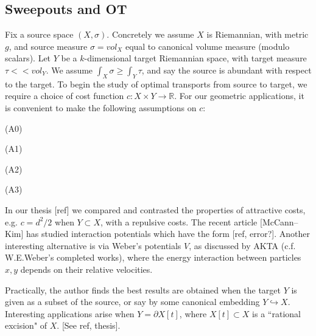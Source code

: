 \documentclass[12pt]{amsart}
\theoremstyle{definition}
\theoremstyle{remark}
\newcommand{\bR}{\mathbb{R}}
\newcommand{\del}{\partial}
\begin{document}
\subsection{Sweepouts and OT}

Fix a source space $(X, \sigma)$. Concretely we assume $X$ is Riemannian, with metric $g$, and source measure $\sigma=vol_X$ equal to canonical volume measure (modulo scalars). Let $Y$ be a $k$-dimensional target Riemannian space, with target measure $\tau<<vol_Y$. We assume $\int_X \sigma \geq \int_Y \tau$, and say the source is abundant with respect to the target. To begin the study of optimal transports from source to target, we require a choice of cost function $c: X\times Y \to \bR$. For our geometric applications, it is convenient to make the following assumptions on $c$: 

(A0)

(A1)

(A2)

(A3)

In our thesis [ref] we compared and contrasted the properties of attractive costs, e.g. $c=d^2/2$ when $Y\subset X$, with a repulsive costs. The recent article [McCann--Kim] has studied interaction potentials which have the form [ref, error?]. Another interesting alternative is via Weber's potentials $V$, as discussed by AKTA (c.f. W.E.Weber's completed works), where the energy interaction between particles $x,y$ depends on their relative velocities. 


Practically, the author finds the best results are obtained when the target $Y$ is given as a subset of the source, or say by some canonical embedding $Y\hookrightarrow X$. Interesting applications arise when $Y=\del X[t]$, where $X[t] \subset X$ is a ``rational excision" of $X$. [See ref, thesis].

\end{document}
